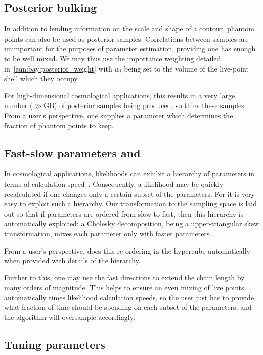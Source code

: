 \subsection{Posterior bulking}
\label{sec:pc:posterior_bulking}
In addition to lending information on the scale and shape of a contour, phantom points can also be used as posterior samples. Correlations between samples are unimportant for the purposes of parameter estimation, providing one has enough to be well mixed. We may thus use the importance weighting detailed in~\eqref{eqn:bay:posterior_weight} with $w_i$ being set to the volume of the live-point shell which they occupy.

For high-dimensional cosmological applications, this results in a very large number ($\gg$GB) of posterior samples being produced, so \PolyChord{} thins these samples. From a user's perspective, one supplies a parameter which determines the fraction of phantom points to keep.

\subsection{Fast-slow parameters and \CosmoChord}
\label{sec:pc:fast_slow}

In cosmological applications, likelihoods can exhibit a hierarchy of parameters in terms of calculation speed~\citep{LewisFastSlow}. Consequently, a likelihood may be quickly recalculated if one changes only a certain subset of the parameters. For \PolyChord{} it is very easy to exploit such a hierarchy. Our transformation to the sampling space is laid out so that if parameters are ordered from slow to fast, then this hierarchy is automatically exploited: a Cholesky decomposition, being a upper-triangular skew transformation, mixes each parameter only with faster parameters.

From a user's perspective, \PolyChord{} does this re-ordering in the hypercube automatically when provided with details of the hierarchy.

Further to this, one may use the fast directions to extend the chain length by many orders of magnitude. This helps to ensure an even mixing of live points. \PolyChord{} automatically times likelihood calculation speeds, so the user just has to provide what fraction of time \PolyChord{} should be spending on each subset of the parameters, and the algorithm will oversample accordingly.

\subsection{Tuning parameters}
\label{sec:pc:tuning_params}

